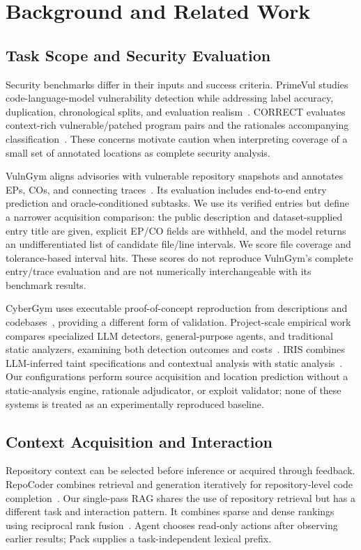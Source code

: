 \section{Background and Related Work}
\subsection{Task Scope and Security Evaluation}
Security benchmarks differ in their inputs and success criteria. PrimeVul studies code-language-model vulnerability detection while addressing label accuracy, duplication, chronological splits, and evaluation realism~\cite{primevul}. CORRECT evaluates context-rich vulnerable/patched program pairs and the rationales accompanying classification~\cite{correct}. These concerns motivate caution when interpreting coverage of a small set of annotated locations as complete security analysis.

VulnGym aligns advisories with vulnerable repository snapshots and annotates EPs, COs, and connecting traces~\cite{vulngym}. Its evaluation includes end-to-end entry prediction and oracle-conditioned subtasks. We use its verified entries but define a narrower acquisition comparison: the public description and dataset-supplied entry title are given, explicit EP/CO fields are withheld, and the model returns an undifferentiated list of candidate file/line intervals. We score file coverage and tolerance-based interval hits. These scores do not reproduce VulnGym's complete entry/trace evaluation and are not numerically interchangeable with its benchmark results.

CyberGym uses executable proof-of-concept reproduction from descriptions and codebases~\cite{cybergym}, providing a different form of validation. Project-scale empirical work compares specialized LLM detectors, general-purpose agents, and traditional static analyzers, examining both detection outcomes and costs~\cite{projectscale}. IRIS combines LLM-inferred taint specifications and contextual analysis with static analysis~\cite{iris}. Our configurations perform source acquisition and location prediction without a static-analysis engine, rationale adjudicator, or exploit validator; none of these systems is treated as an experimentally reproduced baseline.

\subsection{Context Acquisition and Interaction}
Repository context can be selected before inference or acquired through feedback. RepoCoder combines retrieval and generation iteratively for repository-level code completion~\cite{zhang-etal-2023-repocoder}. Our single-pass RAG shares the use of repository retrieval but has a different task and interaction pattern. It combines sparse and dense rankings using reciprocal rank fusion~\cite{rrf}. Agent chooses read-only actions after observing earlier results; Pack supplies a task-independent lexical prefix.

